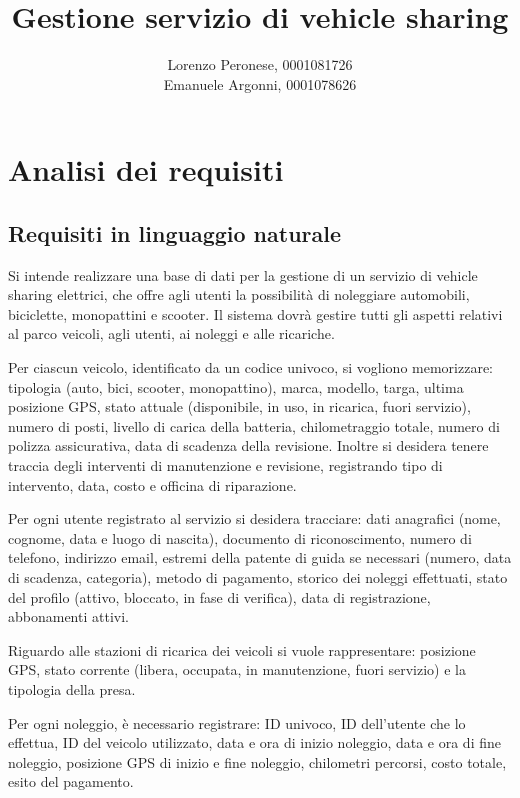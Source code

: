 \documentclass{article}
\title{Gestione servizio di vehicle sharing}
\author{Lorenzo Peronese, 0001081726 \\
Emanuele Argonni, 0001078626}
\begin{document}
\maketitle

\tableofcontents

\newpage

\section{Analisi dei requisiti}

\subsection{Requisiti in linguaggio naturale}

Si intende realizzare una base di dati per la gestione di un servizio di vehicle sharing elettrici, che offre agli utenti la possibilità di noleggiare automobili, biciclette, monopattini e scooter.
Il sistema dovrà gestire tutti gli aspetti relativi al parco veicoli, agli utenti, ai noleggi e alle ricariche.

Per ciascun veicolo, identificato da un codice univoco, si vogliono memorizzare: tipologia (auto, bici, scooter, monopattino), marca, modello, targa, ultima posizione GPS, stato attuale (disponibile, in uso, in ricarica, fuori servizio), numero di posti, livello di carica della batteria, chilometraggio totale, numero di polizza assicurativa, data di scadenza della revisione. Inoltre si desidera tenere traccia degli interventi di manutenzione e revisione, registrando tipo di intervento, data, costo e officina di riparazione.

Per ogni utente registrato al servizio si desidera tracciare: dati anagrafici (nome, cognome, data e luogo di nascita), documento di riconoscimento, numero di telefono, indirizzo email, estremi della patente di guida se necessari (numero, data di scadenza, categoria), metodo di pagamento, storico dei noleggi effettuati, stato del profilo (attivo, bloccato, in fase di verifica), data di registrazione, abbonamenti attivi.

Riguardo alle stazioni di ricarica dei veicoli si vuole rappresentare: posizione GPS, stato corrente (libera, occupata, in manutenzione, fuori servizio) e la tipologia della presa.

Per ogni noleggio, è necessario registrare: ID univoco, ID dell’utente che lo effettua, ID del veicolo utilizzato, data e ora di inizio noleggio, data e ora di fine noleggio, posizione GPS di inizio e fine noleggio, chilometri percorsi, costo totale, esito del pagamento.
\end{document}
